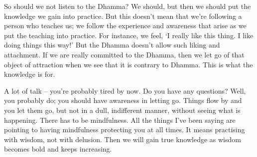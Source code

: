 So should we not listen to the Dhamma? We should, but then we should put the knowledge we gain into practice. But this doesn't mean that we're following a person who teaches us; we follow the experience and awareness that arise as we put the teaching into practice. For instance, we feel, `I really like this thing. I like doing things this way!' But the Dhamma doesn't allow such liking and attachment. If we are really committed to the Dhamma, then we let go of that object of attraction when we see that it is contrary to Dhamma. This is what the knowledge is for.

A lot of talk -- you're probably tired by now. Do you have any questions? Well, you probably do; you should have awareness in letting go. Things flow by and you let them go, but not in a dull, indifferent manner, without seeing what is happening. There has to be mindfulness. All the things I've been saying are pointing to having mindfulness protecting you at all times. It means practising with wisdom, not with delusion. Then we will gain true knowledge as wisdom becomes bold and keeps increasing.
